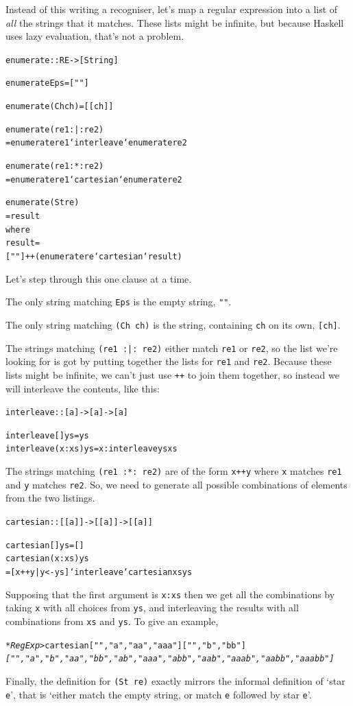 Instead of this writing a recogniser, let's map a regular expression into a list of \emph{all} the strings that it matches. These lists might be infinite, but because Haskell uses lazy evaluation, that's not a problem.
\begin{alltt}
enumerate :: RE -> [String]

enumerate Eps = [""]

enumerate (Ch ch) = [[ch]]

enumerate (re1 :|: re2)
    = enumerate re1 `interleave` enumerate re2

enumerate  (re1 :*: re2)
    = enumerate re1 `cartesian` enumerate re2

enumerate (St re)
    = result 
      where
        result =
            [""] ++ (enumerate re `cartesian` result)
\end{alltt}
Let's step through this one clause at a time.
\begin{titemize}
\item
The only string matching \texttt{Eps} is the empty string, \texttt{""}.
\item
The only string matching \texttt{(Ch ch)} is the string, containing \texttt{ch} on its own, \texttt{[ch]}.
\item
The strings matching \texttt{(re1 :|:\ re2)} either match \texttt{re1} or \texttt{re2}, so the list we're looking for is got by putting together the lists for \texttt{re1} and \texttt{re2}. Because these lists might be infinite, we can't just use \texttt{++} to join them together, so instead we will interleave the contents, like this:
\begin{alltt}
  interleave :: [a] -> [a] -> [a]

  interleave [] ys     = ys
  interleave (x:xs) ys = x : interleave ys xs
\end{alltt}
\item
The strings matching \texttt{(re1 :*:\ re2)} are of the form \texttt{x++y} where \texttt{x} matches \texttt{re1} and \texttt{y} matches \texttt{re2}. So, we need to generate all possible combinations of elements from the two listings.
\begin{alltt}
  cartesian :: [[a]] -> [[a]] -> [[a]]

  cartesian [] ys = []
  cartesian (x:xs) ys 
      = [ x++y | y<-ys ] `interleave` cartesian xs ys
\end{alltt}
Supposing that the first argument is \texttt{x:xs} then  we get all the combinations by taking \texttt{x} with all choices from \texttt{ys}, and interleaving the results with all combinations from \texttt{xs} and \texttt{ys}. To give an example,
\begin{alltt}
  \textsl{*RegExp>} cartesian [ "", "a", "aa", "aaa"] ["", "b", "bb"]
  \textsl{["","a","b","aa","bb","ab","aaa","abb","aab","aaab","aabb","aaabb"]}
\end{alltt}
\item
Finally, the definition for \texttt{(St re)} exactly mirrors the informal definition of `star \texttt{e}', that is `either match the empty string, or match \texttt{e} followed by star \texttt{e}'.
\end{titemize}

